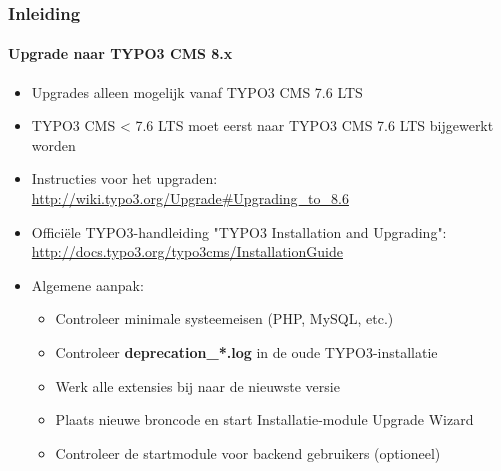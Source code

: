 \begin{frame}[fragile]
	\frametitle{Inleiding}
	\framesubtitle{Upgrade naar TYPO3 CMS 8.x}

	\begin{itemize}
		\item Upgrades alleen mogelijk vanaf TYPO3 CMS 7.6 LTS
		\item TYPO3 CMS < 7.6 LTS moet eerst naar TYPO3 CMS 7.6 LTS bijgewerkt worden
	\end{itemize}

	\begin{itemize}

		\item Instructies voor het upgraden:\newline
			\smaller\url{http://wiki.typo3.org/Upgrade#Upgrading_to_8.6}\normalsize
		\item Officiële TYPO3-handleiding "TYPO3 Installation and Upgrading":
			\smaller\url{http://docs.typo3.org/typo3cms/InstallationGuide}\normalsize
		\item Algemene aanpak:
			\begin{itemize}
				\item Controleer minimale systeemeisen \small(PHP, MySQL, etc.)
				\item Controleer \textbf{deprecation\_*.log} in de oude TYPO3-installatie
				\item Werk alle extensies bij naar de nieuwste versie
				\item Plaats nieuwe broncode en start Installatie-module \textrightarrow Upgrade Wizard
				\item Controleer de startmodule voor backend gebruikers (optioneel)
			\end{itemize}
	\end{itemize}

\end{frame}


